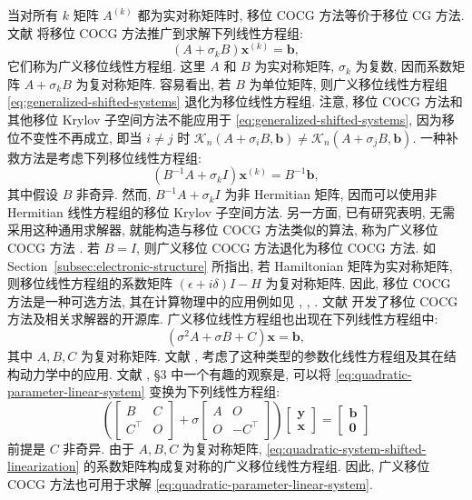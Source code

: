 {当对所有 $k$ 矩阵 $A^{(k)}$ 都为实对称矩阵时, 移位 COCG 方法等价于移位 CG 方法.}
{文献  将移位 COCG 方法推广到求解下列线性方程组:}
\begin{equation}\label{eq:generalized-shifted-systems}(A+\sigma_kB)\bm x^{(k)}=\bm b,\end{equation}
{它们称为广义移位线性方程组. 这里 $A$ 和 $B$ 为实对称矩阵, $\sigma_k$ 为复数, 因而系数矩阵 $A+\sigma_kB$ 为复对称矩阵. 容易看出, 若 $B$ 为单位矩阵, 则广义移位线性方程组 \eqref{eq:generalized-shifted-systems} 退化为移位线性方程组.}
{注意, 移位 COCG 方法和其他移位 Krylov 子空间方法不能应用于 \eqref{eq:generalized-shifted-systems}, 因为移位不变性不再成立, 即当 $i\ne j$ 时 $\mathcal K_n(A+\sigma_iB,\bm b)\ne\mathcal K_n(A+\sigma_jB,\bm b)$. 一种补救方法是考虑下列移位线性方程组:}
\[(B^{-1}A+\sigma_k I)\bm x^{(k)}=B^{-1}\bm b,\]
{其中假设 $B$ 非奇异. 然而, $B^{-1}A+\sigma_k I$ 为非 Hermitian 矩阵, 因而可以使用非 Hermitian 线性方程组的移位 Krylov 子空间方法. 另一方面, 已有研究表明, 无需采用这种通用求解器, 就能构造与移位 COCG 方法类似的算法, 称为广义移位 COCG 方法 . 若 $B=I$, 则广义移位 COCG 方法退化为移位 COCG 方法.}
{如 Section\ \ref{subsec:electronic-structure} 所指出, 若 Hamiltonian 矩阵为实对称矩阵, 则移位线性方程组的系数矩阵 $(\epsilon+i\delta)I-H$ 为复对称矩阵. 因此, 移位 COCG 方法是一种可选方法, 其在计算物理中的应用例如见 , , . 文献  开发了移位 COCG 方法及相关求解器的开源库.}
{广义移位线性方程组也出现在下列线性方程组中:}
\begin{equation}\label{eq:quadratic-parameter-linear-system}(\sigma^2A+\sigma B+C)\bm x=\bm b,\end{equation}
{其中 $A,B,C$ 为复对称矩阵. 文献 ,  考虑了这种类型的参数化线性方程组及其在结构动力学中的应用. 文献 , \S3 中一个有趣的观察是, 可以将 \eqref{eq:quadratic-parameter-linear-system} 变换为下列线性方程组:}
\begin{equation}\label{eq:quadratic-system-shifted-linearization}\left(\begin{bmatrix}B&C\\C^{\top}&O\end{bmatrix}+\sigma\begin{bmatrix}A&O\\O&-C^{\top}\end{bmatrix}\right)\begin{bmatrix}\bm y\\\bm x\end{bmatrix}=\begin{bmatrix}\bm b\\\bm0\end{bmatrix}\end{equation}
{前提是 $C$ 非奇异. 由于 $A,B,C$ 为复对称矩阵, \eqref{eq:quadratic-system-shifted-linearization} 的系数矩阵构成复对称的广义移位线性方程组. 因此, 广义移位 COCG 方法也可用于求解 \eqref{eq:quadratic-parameter-linear-system}.}

